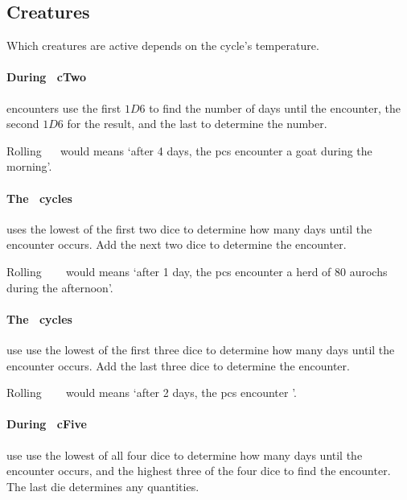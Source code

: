 \begin{multicols}{2}

\subsection{Creatures}

Which creatures are active depends on the \gls{cycle}'s temperature.

\setcounter{enc}{19}
\begin{boxtable}[rXc]
\end{boxtable}

\setcounter{temperature}{0}
\paragraph{During \showTemperature\ \gls{cTwo}}
encounters use the first $1D6$ to find the number of days until the encounter, the second $1D6$ for the result, and the last to determine the number.

Rolling ~~ would means `after 4 days, the \glspl{pc} encounter a goat during the morning'.

\paragraph{The \showTemperature\ \glspl{cycle}}
uses the lowest of the first two dice to determine how many days until the encounter occurs.
Add the next two dice to determine the encounter.

Rolling ~~~ would means `after 1 day, the \glspl{pc} encounter a herd of 80 aurochs during the afternoon'.

\paragraph{The \showTemperature\ \glspl{cycle}}
use use the lowest of the first three dice to determine how many days until the encounter occurs.
Add the last three dice to determine the encounter.

Rolling ~~~ would means `after 2 days, the \glspl{pc} encounter '.

\paragraph{During \showTemperature\ \gls{cFive}}
use use the lowest of all four dice to determine how many days until the encounter occurs, and the highest three of the four dice to find the encounter.
The last die determines any quantities.


\end{multicols}
